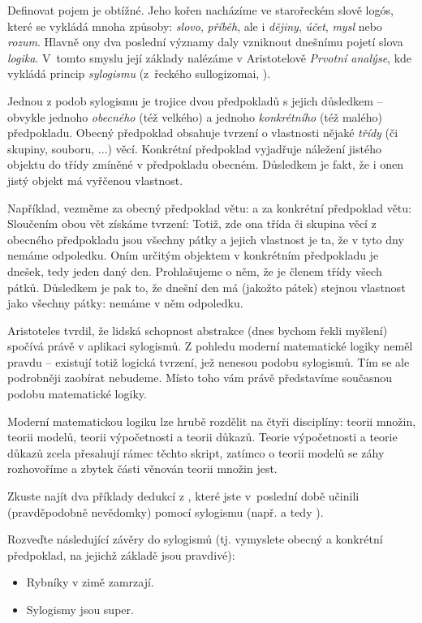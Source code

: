 Definovat pojem  je obtížné. Jeho kořen nacházíme ve starořeckém
slově \textgreek{logós}, které se vykládá mnoha způsoby: \emph{slovo},
\emph{příběh}, ale i \emph{dějiny}, \emph{účet}, \emph{mysl} nebo \emph{rozum}.
Hlavně ony dva poslední významy daly vzniknout dnešnímu pojetí slova
\emph{logika}. V~tomto smyslu její základy nalézáme v Aristotelově \emph{Prvotní
analýse}, kde vykládá princip \emph{sylogismu} (z~řeckého
\textgreek{sullogizomai}, ).

Jednou z podob sylogismu je trojice dvou předpokladů s jejich důsledkem --
obvykle jednoho \emph{obecného} (též velkého) a jednoho \emph{konkrétního} (též
malého) předpokladu. Obecný předpoklad obsahuje tvrzení o vlastnosti nějaké
\emph{třídy} (či skupiny, souboru, ...) věcí. Konkrétní předpoklad vyjadřuje
náležení jistého objektu do třídy zmíněné v předpokladu obecném. Důsledkem je
fakt, že i onen jistý objekt má vyřčenou vlastnost.

Například, vezměme za obecný předpoklad větu:  a
za konkrétní předpoklad větu:  Sloučením obou vět získáme
tvrzení:  Totiž, zde ona třída či skupina věcí z
obecného předpokladu jsou všechny pátky a jejich vlastnost je ta, že v tyto dny
nemáme odpoledku. Oním určitým objektem v konkrétním předpokladu je dnešek, tedy
jeden daný den. Prohlašujeme o něm, že je členem třídy všech pátků. Důsledkem je
pak to, že dnešní den má (jakožto pátek) stejnou vlastnost jako všechny pátky:
nemáme v něm odpoledku.

Aristoteles tvrdil, že lidská schopnost abstrakce (dnes bychom řekli
 myšlení) spočívá právě v aplikaci sylogismů. Z pohledu moderní
matematické logiky neměl pravdu -- existují totiž logická tvrzení, jež nenesou
podobu sylogismů. Tím se ale podrobněji zaobírat nebudeme. Místo toho vám právě
představíme současnou podobu matematické logiky.

Moderní matematickou logiku lze hrubě rozdělit na čtyři disciplíny: teorii
množin, teorii modelů, teorii výpočetnosti a teorii důkazů. Teorie výpočetnosti
a teorie důkazů zcela přesahují rámec těchto skript, zatímco o teorii modelů se
záhy rozhovoříme a zbytek části věnován teorii množin jest.

\begin{exercise}
  Zkuste najít dva příklady dedukcí z , které jste v~poslední
  době učinili (pravděpodobně nevědomky) pomocí sylogismu (např.  a  tedy ).
\end{exercise}
\clearpage
\begin{exercise}
  Rozveďte následující závěry do sylogismů (tj. vymyslete obecný a konkrétní
  předpoklad, na jejichž základě jsou pravdivé):
  \begin{itemize}
    \item Rybníky v zimě zamrzají.
    \item Sylogismy jsou super.
  \end{itemize}
\end{exercise}

